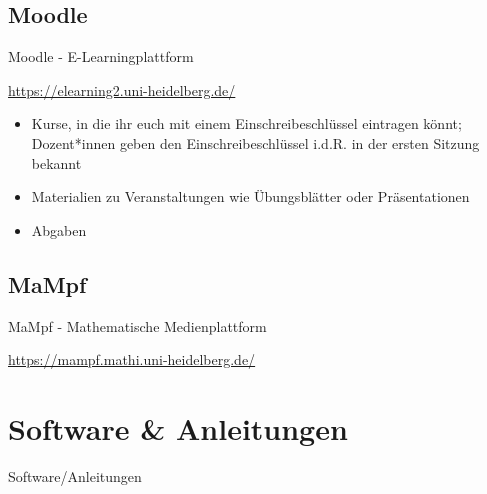 \subsection{Moodle}
\begin{frame}{Moodle - E-Learningplattform}

    \url{https://elearning2.uni-heidelberg.de/}

    \begin{center}
    \end{center}

    \begin{itemize}
        \item{Kurse, in die ihr euch mit einem Einschreibeschlüssel eintragen könnt; Dozent*innen geben den Einschreibeschlüssel i.d.R. in der ersten Sitzung bekannt}
        \item{Materialien zu Veranstaltungen wie Übungsblätter oder Präsentationen}
        \item{Abgaben}
    \end{itemize}

\end{frame}


\subsection{MaMpf}
\begin{frame}{MaMpf - Mathematische Medienplattform}

    \url{https://mampf.mathi.uni-heidelberg.de/}

    \begin{center}
    \end{center}

\end{frame}


\section{Software \& Anleitungen}
\begin{frame}{Software/Anleitungen}
\end{frame}

